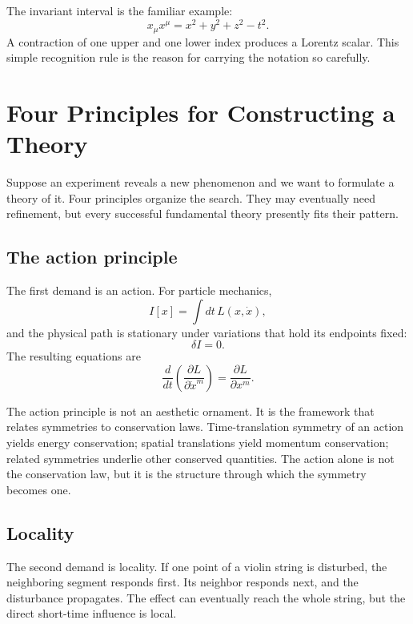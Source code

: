The invariant interval is the familiar example:
\begin{equation}
x_\mu x^\mu
=
x^2+y^2+z^2-t^2.
\label{eq:sr7-interval}
\end{equation}
A contraction of one upper and one lower index produces a Lorentz scalar.
This simple recognition rule is the reason for carrying the notation so
carefully.

\section{Four Principles for Constructing a Theory}

Suppose an experiment reveals a new phenomenon and we want to formulate a
theory of it.  Four principles organize the search.  They may eventually
need refinement, but every successful fundamental theory presently fits
their pattern.

\subsection{The action principle}

The first demand is an action.  For particle mechanics,
\begin{equation}
I[x]
=
\int dt\,L(x,\dot x),
\label{eq:sr7-particle-action-general}
\end{equation}
and the physical path is stationary under variations that hold its
endpoints fixed:
\begin{equation}
\delta I=0.
\end{equation}
The resulting equations are
\begin{equation}
\frac{d}{dt}
\left(
\frac{\partial L}{\partial\dot x^m}
\right)
=
\frac{\partial L}{\partial x^m}.
\label{eq:sr7-EL}
\end{equation}

The action principle is not an aesthetic ornament.  It is the framework
that relates symmetries to conservation laws.  Time-translation symmetry of
an action yields energy conservation; spatial translations yield momentum
conservation; related symmetries underlie other conserved quantities.  The
action alone is not the conservation law, but it is the structure through
which the symmetry becomes one.

\subsection{Locality}

The second demand is locality.  If one point of a violin string is disturbed,
the neighboring segment responds first.  Its neighbor responds next, and
the disturbance propagates.  The effect can eventually reach the whole
string, but the direct short-time influence is local.

